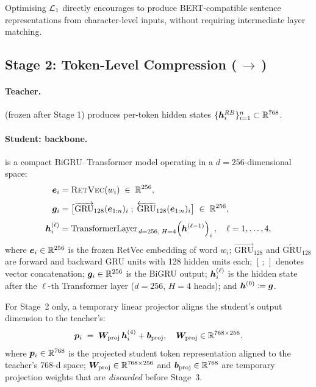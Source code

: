 Optimising $\mathcal{L}_1$ directly encourages \RetBERT{} to produce
BERT-compatible sentence representations from character-level inputs, without
requiring intermediate layer matching.

\subsection{Stage 2: Token-Level Compression
            (\RetBERT{}\,$\to$\,\LightRet{})}
\label{subsec:stage2}

\paragraph{Teacher.}
\RetBERT{} (frozen after Stage 1) produces per-token hidden states
$\{\bm{h}^{RB}_{i}\}_{i=1}^{n} \subset \mathbb{R}^{768}$.

\paragraph{Student: \LightRet{} backbone.}
\LightRet{} is a compact BiGRU--Transformer model operating in a
$d=256$-dimensional space:
\begin{align}
  \bm{e}_i &= \textsc{RetVec}(w_i) \;\in\; \mathbb{R}^{256},
  \label{eq:lr_embed}\\[4pt]
  \bm{g}_i &= \bigl[
             \overrightarrow{\text{GRU}}_{128}(\bm{e}_{1:n})_i\;;\;
             \overleftarrow{\text{GRU}}_{128}(\bm{e}_{1:n})_i
           \bigr]
           \;\in\; \mathbb{R}^{256},
  \label{eq:lr_bigru}\\[4pt]
  \bm{h}^{(\ell)}_i &= \text{TransformerLayer}_{\,d=256,\;H=4}
                    \!\left(\bm{h}^{(\ell-1)}\right)_i,
                    \quad \ell = 1,\ldots,4,
  \label{eq:lr_transformer}
\end{align}
where $\bm{e}_i \in \mathbb{R}^{256}$ is the frozen RetVec embedding of word $w_i$; $\overrightarrow{\text{GRU}}_{128}$ and $\overleftarrow{\text{GRU}}_{128}$ are forward and backward GRU units with 128 hidden units each; $[\,;\,]$ denotes vector concatenation; $\bm{g}_i \in \mathbb{R}^{256}$ is the BiGRU output; $\bm{h}^{(\ell)}_i$ is the hidden state after the $\ell$-th Transformer layer ($d{=}256$, $H{=}4$ heads); and $\bm{h}^{(0)} \coloneqq \bm{g}$.

For Stage~2 only, a temporary linear projector aligns the student's
output dimension to the teacher's:
\begin{equation}
  \bm{p}_i \;=\; \bm{W}_{\text{proj}}\,\bm{h}^{(4)}_i + \bm{b}_{\text{proj}},
  \quad \bm{W}_{\text{proj}} \in \mathbb{R}^{768 \times 256}.
  \label{eq:lr_proj}
\end{equation}
\noindent where $\bm{p}_i \in \mathbb{R}^{768}$ is the projected student token representation aligned to the teacher's 768-d space; $\bm{W}_{\text{proj}} \in \mathbb{R}^{768 \times 256}$ and $\bm{b}_{\text{proj}} \in \mathbb{R}^{768}$ are temporary projection weights that are \emph{discarded} before Stage~3.

